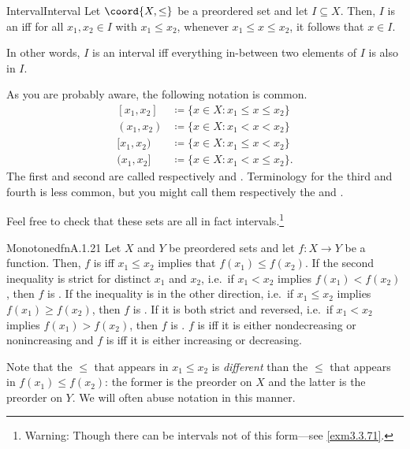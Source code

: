 \begin{dfn}{Interval}{Interval}
Let $\coord{X,\leq}$ be a preordered set and let $I\subseteq X$.  Then, $I$ is an  iff for all $x_1,x_2\in I$ with $x_1\leq x_2$, whenever $x_1\leq x\leq x_2$, it follows that $x\in I$.
\begin{rmk}
In other words, $I$ is an interval iff everything in-between two elements of $I$ is also in $I$.
\end{rmk}
\begin{rmk}
As you are probably aware, the following notation is common.
\begin{subequations}
\begin{align*}
[x_1,x_2] & \coloneqq \{ x\in X:x_1\leq x\leq x_2\} \\
(x_1,x_2) & \coloneqq \{ x\in X:x_1<x<x_2\} \\
[x_1,x_2) & \coloneqq \{ x\in X:x_1\leq x<x_2\} \\
(x_1,x_2] & \coloneqq \{ x\in X:x_1<x\leq x_2\} .
\end{align*}
\end{subequations}
The first and second are called respectively  and .  Terminology for the third and fourth is less common, but you might call them respectively the  and .

Feel free to check that these sets are all in fact intervals.\footnote{Warning:  Though there can be intervals not of this form---see \cref{exm3.3.71}.}
\end{rmk}
\end{dfn}
\begin{dfn}{Monotone}{dfnA.1.21}
Let $X$ and $Y$ be preordered sets and let $f\colon X\rightarrow Y$ be a function.  Then, $f$ is  iff $x_1\leq x_2$ implies that $f(x_1)\leq f(x_2)$.  If the second inequality is strict for distinct $x_1$ and $x_2$, i.e.~if $x_1<x_2$ implies $f(x_1)<f(x_2)$, then $f$ is .  If the inequality is in the other direction, i.e.~if $x_1\leq x_2$ implies $f(x_1)\geq f(x_2)$, then $f$ is .  If it is both strict and reversed, i.e.~if $x_1<x_2$ implies $f(x_1)>f(x_2)$, then $f$ is .  $f$ is  iff it is either nondecreasing or nonincreasing and $f$ is  iff it is either increasing or decreasing.
\begin{rmk}
Note that the $\leq$ that appears in $x_1\leq x_2$ is \emph{different} than the $\leq$ that appears in $f(x_1)\leq f(x_2)$:  the former is the preorder on $X$ and the latter is the preorder on $Y$.  We will often abuse notation in this manner.
\end{rmk}
\end{dfn}

